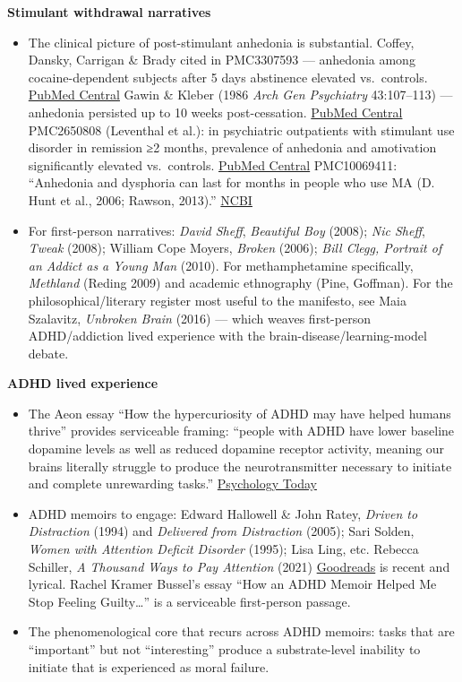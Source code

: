 \textbf{Stimulant withdrawal narratives}

\begin{itemize}
\tightlist
\item
  The clinical picture of post-stimulant anhedonia is substantial. Coffey, Dansky, Carrigan \& Brady cited in PMC3307593 --- anhedonia among cocaine-dependent subjects after 5 days abstinence elevated vs.~controls. \href{https://pmc.ncbi.nlm.nih.gov/articles/PMC2650808/}{PubMed Central} Gawin \& Kleber (1986 \emph{Arch Gen Psychiatry} 43:107--113) --- anhedonia persisted up to 10 weeks post-cessation. \href{https://pmc.ncbi.nlm.nih.gov/articles/PMC2650808/}{PubMed Central} PMC2650808 (Leventhal et al.): in psychiatric outpatients with stimulant use disorder in remission ≥2 months, prevalence of anhedonia and amotivation significantly elevated vs.~controls. \href{https://pmc.ncbi.nlm.nih.gov/articles/PMC2650808/}{PubMed Central} PMC10069411: ``Anhedonia and dysphoria can last for months in people who use MA (D. Hunt et al., 2006; Rawson, 2013).'' \href{https://www.ncbi.nlm.nih.gov/books/NBK576550/}{NCBI}
\item
  For first-person narratives: \emph{David Sheff}, \emph{Beautiful Boy} (2008); \emph{Nic Sheff}, \emph{Tweak} (2008); William Cope Moyers, \emph{Broken} (2006); \emph{Bill Clegg, Portrait of an Addict as a Young Man} (2010). For methamphetamine specifically, \emph{Methland} (Reding 2009) and academic ethnography (Pine, Goffman). For the philosophical/literary register most useful to the manifesto, see Maia Szalavitz, \emph{Unbroken Brain} (2016) --- which weaves first-person ADHD/addiction lived experience with the brain-disease/learning-model debate.
\end{itemize}

\textbf{ADHD lived experience}

\begin{itemize}
\tightlist
\item
  The Aeon essay ``How the hypercuriosity of ADHD may have helped humans thrive'' provides serviceable framing: ``people with ADHD have lower baseline dopamine levels as well as reduced dopamine receptor activity, meaning our brains literally struggle to produce the neurotransmitter necessary to initiate and complete unrewarding tasks.'' \href{https://www.psychologytoday.com/us/blog/mind-the-generation-gap/202601/adhd-and-the-motivation-that-never-comes}{Psychology Today}
\item
  ADHD memoirs to engage: Edward Hallowell \& John Ratey, \emph{Driven to Distraction} (1994) and \emph{Delivered from Distraction} (2005); Sari Solden, \emph{Women with Attention Deficit Disorder} (1995); Lisa Ling, etc. Rebecca Schiller, \emph{A Thousand Ways to Pay Attention} (2021) \href{https://www.goodreads.com/book/show/58328363-a-thousand-ways-to-pay-attention}{Goodreads} is recent and lyrical. Rachel Kramer Bussel's essay ``How an ADHD Memoir Helped Me Stop Feeling Guilty\ldots{}'' is a serviceable first-person passage.
\item
  The phenomenological core that recurs across ADHD memoirs: tasks that are ``important'' but not ``interesting'' produce a substrate-level inability to initiate that is experienced as moral failure.
\end{itemize}

